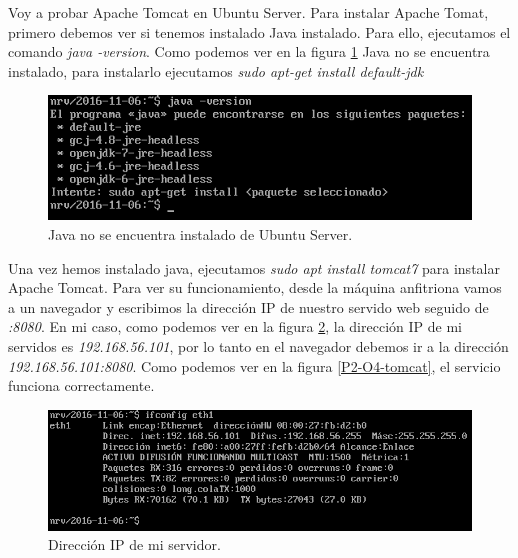 \documentclass[a4paper,titlepage,12pt]{report}	%
\numberwithin{figure}{section} %
\numberwithin{table}{section} %
\begin{document}
	Voy a probar Apache Tomcat \cite{apachetomcat} en Ubuntu Server. Para instalar Apache Tomat, primero debemos ver si tenemos instalado Java instalado. Para ello, ejecutamos el comando \textit{java -version}. Como podemos ver en la figura \ref{P2-O4-javaversion} Java no se encuentra instalado, para instalarlo ejecutamos \textit{sudo apt-get install default-jdk}
	\begin{figure}[H]
		\includegraphics[width=\linewidth]{./Imagenes/P2/O4-javaversion.png}
		\vspace{-0.5cm}
		\caption[Java no se encuentra instalado de Ubuntu Server.]{Java no se encuentra instalado de Ubuntu Server.}
		\label{P2-O4-javaversion}
	\end{figure}

	Una vez hemos instalado java, ejecutamos \textit{sudo apt install tomcat7} para instalar Apache Tomcat. Para ver su funcionamiento, desde la máquina anfitriona vamos a un navegador y escribimos la dirección IP de nuestro servido web seguido de \textit{:8080}. En mi caso, como podemos ver en la figura \ref{P2-O4-ip}, la dirección IP de mi servidos es \textit{192.168.56.101}, por lo tanto en el navegador debemos ir a la dirección \textit{192.168.56.101:8080}. Como podemos ver en la figura \ref{P2-O4-tomcat}, el servicio funciona correctamente.
	\begin{figure}[H]
		\centering
		\includegraphics[scale=0.6]{./Imagenes/P2/O4-ip.png}
		\caption[Dirección IP de mi servidor.]{Dirección IP de mi servidor.}
		\label{P2-O4-ip}
	\end{figure}
\end{document}
